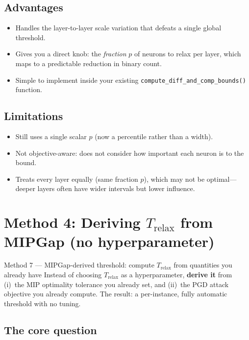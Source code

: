 \documentclass[11pt,a4paper]{article}
\newcommand{\Trelax}{T_{\mathrm{relax}}}
\begin{document}
\subsection{Advantages}
\begin{itemize}
  \item Handles the layer-to-layer scale variation that defeats a single
        global threshold.
  \item Gives you a direct knob: the \emph{fraction} $p$ of neurons to relax
        per layer, which maps to a predictable reduction in binary count.
  \item Simple to implement inside your existing
        \texttt{compute\_diff\_and\_comp\_bounds()} function.
\end{itemize}

\subsection{Limitations}
\begin{itemize}
  \item Still uses a single scalar $p$ (now a percentile rather than a width).
  \item Not objective-aware: does not consider how important each neuron is
        to the bound.
  \item Treats every layer equally (same fraction $p$), which may not be
        optimal---deeper layers often have wider intervals but lower influence.
\end{itemize}


\section{Method 4: Deriving $\Trelax$ from MIPGap (no hyperparameter)}%
\label{sec:method4}

\begin{idea}{Method 7 --- MIPGap-derived threshold: compute $\Trelax$ from
quantities you already have}
Instead of choosing $\Trelax$ as a hyperparameter, \textbf{derive it} from
(i)~the MIP optimality tolerance you already set, and (ii)~the PGD attack
objective you already compute.  The result: a per-instance, fully automatic
threshold with no tuning.
\end{idea}

\subsection{The core question}
\end{document}
